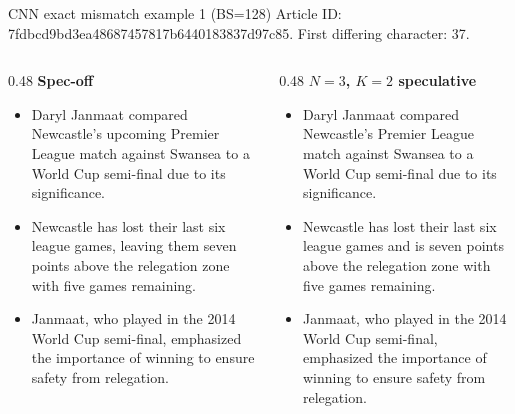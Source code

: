 \documentclass[aspectratio=169]{beamer}
\begin{document}
\begin{frame}{CNN exact mismatch example 1 (BS=128)}
  \scriptsize
  \textcolor{black!65}{Article ID: 7fdbcd9bd3ea48687457817b6440183837d97c85. First differing character: 37.}

  \vspace{0.16cm}
  \begin{columns}[T,onlytextwidth]
    \begin{column}{0.48\textwidth}
      \textbf{Spec-off}
      \begin{itemize}\setlength{\itemsep}{0.22cm}
        \item Daryl Janmaat compared Newcastle's upcoming Premier League match against Swansea to a World Cup semi-final due to its significance.
        \item Newcastle has lost their last six league games, leaving them seven points above the relegation zone with five games remaining.
        \item Janmaat, who played in the 2014 World Cup semi-final, emphasized the importance of winning to ensure safety from relegation.
      \end{itemize}
    \end{column}
    \begin{column}{0.48\textwidth}
      \textbf{$N=3$, $K=2$ speculative}
      \begin{itemize}\setlength{\itemsep}{0.22cm}
        \item Daryl Janmaat compared Newcastle's Premier League match against Swansea to a World Cup semi-final due to its significance.
        \item Newcastle has lost their last six league games and is seven points above the relegation zone with five games remaining.
        \item Janmaat, who played in the 2014 World Cup semi-final, emphasized the importance of winning to ensure safety from relegation.
      \end{itemize}
    \end{column}
  \end{columns}
\end{frame}
\end{document}
